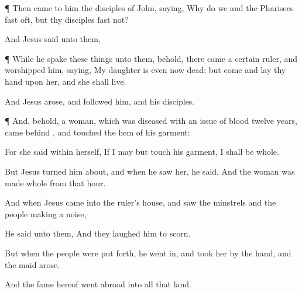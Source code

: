 {


\par }{\PP {}¶
Then came
to
him the
disciples of
John,
saying,
Why
do
we
and the
Pharisees
fast
oft,
but
thy
disciples
fast
not?

And
Jesus
said unto
them,
{}




\par }{\PP {}¶
While
he
spake these
things unto
them,
behold, there
came a certain
ruler,
and
worshipped
him,
saying,
My
daughter
is even
now
dead:
but come
and
lay
thy
hand
upon
her,
and she shall
live.

And
Jesus arose,
and
followed
him,
and
{}
his
disciples.


\par }{\PP {}¶
And,
behold, a
woman, which was diseased with an issue of
blood
twelve
years,
came
behind
{}, and
touched the
hem
of
his
garment:

For she
said
within
herself,
If I
may
but
touch
his
garment, I shall be
whole.

But
Jesus turned him
about,
and when he
saw
her, he
said,
{}
And the
woman was made
whole
from
that
hour.

And
when
Jesus
came
into the
ruler’s
house,
and
saw the
minstrels
and the
people making a
noise,

He
said unto
them,
{}
And they
laughed
him to
scorn.

But
when the
people were put
forth, he went in,
and
took
her by the
hand,
and the
maid
arose.

And the
fame
hereof went
abroad
into
all
that
land.


}
